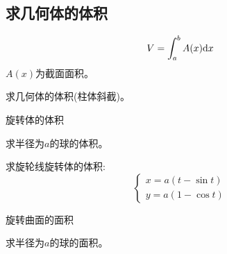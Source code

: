 \subsection{求几何体的体积}
\begin{equation*}
    V = \int_a^b A(x) \mathrm{d} x
\end{equation*}
$A(x)$为截面面积。

\begin{example}
    求几何体的体积(柱体斜截)。
\end{example}
\begin{solution}
    
\end{solution}

\begin{example}
    旋转体的体积
\end{example}
\begin{solution}
    
\end{solution}

\begin{example}
    求半径为$a$的球的体积。
\end{example}
\begin{solution}
    
\end{solution}

\begin{example}
    求旋轮线旋转体的体积:
    \begin{equation*}
        \begin{cases}
            x = a(t-\sin t) \\
            y = a(1 - \cos t)
        \end{cases}
    \end{equation*}
\end{example}
\begin{solution}
    
\end{solution}

\begin{example}
    旋转曲面的面积
\end{example}
\begin{solution}
    
\end{solution}

\begin{example}
    求半径为$a$的球的面积。
\end{example}
\begin{solution}
    
\end{solution}


